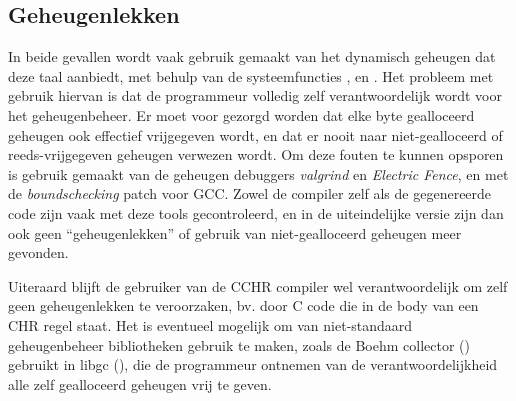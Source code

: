 \subsection{Geheugenlekken} \label{sec:memleaks}


In beide gevallen wordt vaak gebruik gemaakt van het dynamisch geheugen dat deze taal aanbiedt, met behulp van de systeemfuncties ,  en . Het probleem met gebruik hiervan is dat de programmeur volledig zelf verantwoordelijk wordt voor het geheugenbeheer. Er moet voor gezorgd worden dat elke byte gealloceerd geheugen ook effectief vrijgegeven wordt, en dat er nooit naar niet-gealloceerd of reeds-vrijgegeven geheugen verwezen wordt. Om deze fouten te kunnen opsporen is gebruik gemaakt van de geheugen debuggers {\em valgrind} en {\em Electric Fence}, en met de  {\em boundschecking} patch voor GCC. Zowel de compiler zelf als de gegenereerde code zijn vaak met deze tools gecontroleerd, en in de uiteindelijke versie zijn dan ook geen ``geheugenlekken'' of gebruik van niet-gealloceerd geheugen meer gevonden.

Uiteraard blijft de gebruiker van de CCHR compiler wel verantwoordelijk om zelf geen geheugenlekken te veroorzaken, bv. door C code die in de body van een CHR regel staat. Het is eventueel mogelijk om van niet-standaard geheugenbeheer bibliotheken gebruik te maken, zoals de Boehm collector (\cite{boehmgc}) gebruikt in libgc (\cite{libgc}), die de programmeur ontnemen van de verantwoordelijkheid alle zelf gealloceerd geheugen vrij te geven.
